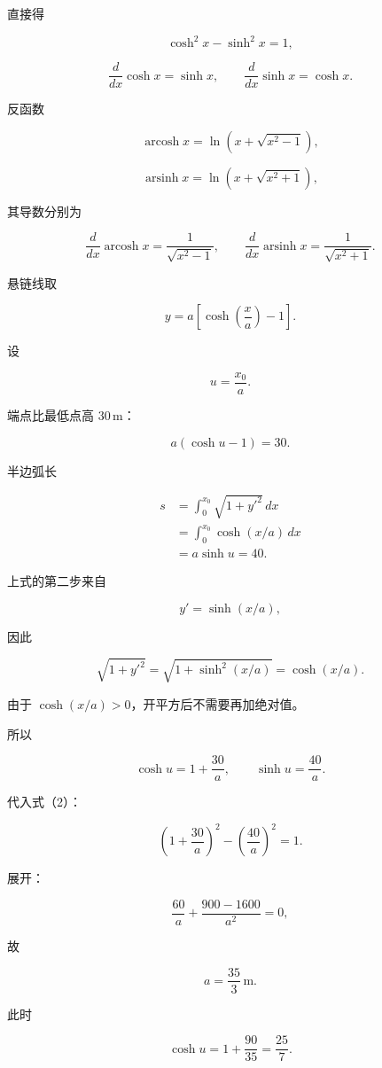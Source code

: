 \documentclass[12pt,a4paper,UTF8]{ctexart}
\begin{document}
直接得

\[
\cosh^2x-\sinh^2x=1,
\tag{2}
\]

\[
\frac d{dx}\cosh x=\sinh x,\qquad
\frac d{dx}\sinh x=\cosh x.
\tag{3}
\]

反函数

\[
\operatorname{arcosh}x
=\ln\left(x+\sqrt{x^2-1}\right),
\tag{4}
\]

\[
\operatorname{arsinh}x
=\ln\left(x+\sqrt{x^2+1}\right),
\tag{5}
\]

其导数分别为

\[
\frac d{dx}\operatorname{arcosh}x
=\frac1{\sqrt{x^2-1}},
\qquad
\frac d{dx}\operatorname{arsinh}x
=\frac1{\sqrt{x^2+1}}.
\tag{6}
\]

悬链线取

\[
y=a\left[\cosh\left(\frac xa\right)-1\right].
\tag{7}
\]

设

\[
u=\frac{x_0}{a}.
\tag{8}
\]

端点比最低点高 \(30\,\mathrm m\)：

\[
a(\cosh u-1)=30.
\tag{9}
\]

半边弧长

\[
\begin{aligned}
s
&=\int_0^{x_0}\sqrt{1+y'^2}\,dx\\
&=\int_0^{x_0}\cosh(x/a)\,dx\\
&=a\sinh u=40.
\end{aligned}
\tag{10}
\]

上式的第二步来自

\[
y'=\sinh(x/a),
\]

因此

\[
\sqrt{1+y'^2}
=\sqrt{1+\sinh^2(x/a)}
=\cosh(x/a).
\]

由于 \(\cosh(x/a)>0\)，开平方后不需要再加绝对值。

所以

\[
\cosh u=1+\frac{30}{a},
\qquad
\sinh u=\frac{40}{a}.
\tag{11}
\]

代入式（2）：

\[
\left(1+\frac{30}{a}\right)^2
-\left(\frac{40}{a}\right)^2=1.
\tag{12}
\]

展开：

\[
\frac{60}{a}+\frac{900-1600}{a^2}=0,
\tag{13}
\]

故

\[
\boxed{a=\frac{35}{3}\,\mathrm m}.
\tag{14}
\]

此时

\[
\cosh u=1+\frac{90}{35}=\frac{25}{7}.
\tag{15}
\]
\end{document}
